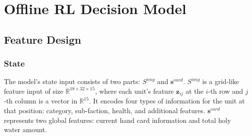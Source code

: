 \documentclass[runningheads]{llncs}
\def\bd{\boldsymbol}        %
\begin{document}
% 

\section{Offline RL Decision Model}
\subsection{Feature Design}
\subsubsection{State}
The model's state input consists of two parts:
$S^{img}$ and $\bd{s}^{card}$. $S^{img}$ is a grid-like feature input of size $\mathbb{R}^{18\times 32\times 15}$,
where each unit's feature $\bd{z}_{ij}$ at the $i$-th row and $j$-th column is a vector in $\mathbb{R}^{15}$.
It encodes four types of information for the unit at that position: category, sub-faction, health, and additional features.
$\bd{s}^{card}$ represents two global features: current hand card information and total holy water amount.
\end{document}
